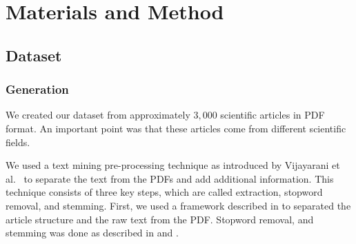 \chapter{Materials and Method}
\label{cha:materials_and_method}

\section{Dataset}
\label{sec:dataset}

\subsection{Generation}
\label{subsec:generation}

We created our dataset from approximately $3,000$ scientific articles in PDF format. An important point was that these articles come from different scientific fields.

We used a text mining pre-processing technique as introduced by Vijayarani et al.~\cite{Vijayarani2015} to separate the text from the PDFs and add additional information. This technique consists of three key steps, which are called extraction, stopword removal, and stemming. First, we used a framework described in  to separated the article structure and the raw text from the PDF. Stopword removal, and stemming was done as described in  and .

